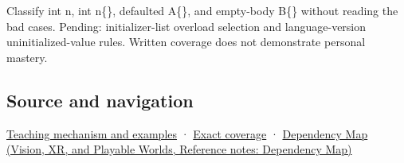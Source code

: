 Classify int n, int n\{\}, defaulted A\{\}, and empty-body B\{\} without reading the bad cases. Pending: initializer-list overload selection and language-version uninitialized-value rules. Written coverage does not demonstrate personal mastery.

\subsection{Source and navigation}\label{appendix-ba8c1a9fe03f-source-and-navigation}

\hyperref[01-foundations-i-ch003-empty-syntax-does-not-promise-initialized-members]{Teaching mechanism and examples} · \hyperref[appendix-fd090d982a15-m009---parts-127-147]{Exact coverage} · \href{../07-Vision-XR-and-Playable-Worlds/main.pdf\#nameddest=appendix-4ad47bdd269a}{Dependency Map (Vision, XR, and Playable Worlds, Reference notes: Dependency Map)}
